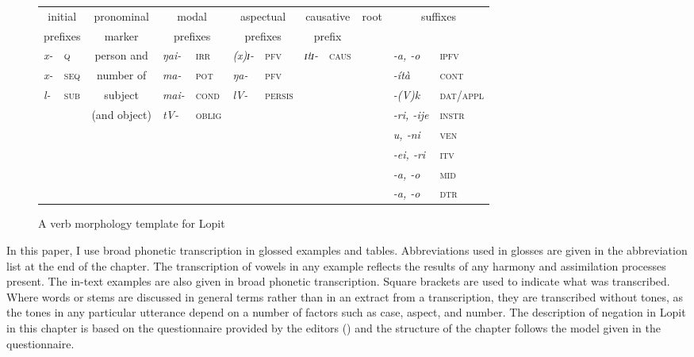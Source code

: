 \documentclass[output=paper,colorlinks,citecolor=brown,draftmode]{langscibook}
\begin{document}
\begin{figure} \footnotesize
\begin{tabular}{l@{  }l | c | l@{  }l | l@{ }l | l@{ }l | c@{} | l @{ }l}
\multicolumn{2}{c|}{initial} & \multicolumn{1}{c|}{pronominal} & \multicolumn{2}{c|}{modal} & \multicolumn{2}{c|}{aspectual} & \multicolumn{2}{c|}{causative} & \multicolumn{1}{c|}{root} & \multicolumn{2}{c}{suffixes}\\
\multicolumn{2}{c|}{prefixes} & \multicolumn{1}{c|}{marker} & \multicolumn{2}{c|}{prefixes} & \multicolumn{2}{c|}{prefixes} & \multicolumn{2}{c|}{prefix} & & \\
\hline
\textit{x-} & \textsc{q} & {person and} & \textit{ŋai-} &  \textsc{irr} & \textit{(x)ɪ-} & \textsc{pfv} & \textit{ɪtɪ-} & \textsc{caus} && \textit{-a, -o} & \textsc{ipfv} \\
\textit{x-} & \textsc{seq} & number of &  \textit{ma-} & \textsc{pot} & \textit{ŋa-} & \textsc{pfv} &  & & & \textit{-ítà} & \textsc{cont} \\
\textit{l-} & \textsc{sub} & subject & \textit{mai-} & \textsc{cond} & \textit{lV-} & \textsc{persis} & & &  & \textit{-(V)k} & \textsc{dat/appl} \\
& & (and object) & \textit{tV-} & \textsc{oblig} &  &  & &  &  & \textit{-ri, -ije} & \textsc{instr}\\
\multicolumn{2}{c}{} &  &  &  &  &  &  &  &  & \textit{u, -ni} & \textsc{ven}\\
\multicolumn{2}{c}{} &  &  &  &  &  &  &  &  & \textit{-ei, -ri} & \textsc{itv}\\
\multicolumn{2}{c}{} &  &  &  &  &  &  &  &  & \textit{-a, -o} & \textsc{mid} \\
\multicolumn{2}{c}{} &  &  &  &  &  &  &  &  & \textit{-a, -o} & \textsc{dtr}\\
\end{tabular}
\caption{A verb morphology template for Lopit}
\label{fig:lop:2}
\end{figure}

In this paper, I use broad phonetic transcription in glossed examples and tables. Abbreviations used in glosses are given in the abbreviation list at the end of the chapter. The transcription of vowels in any example reflects the results of any harmony and assimilation processes present. The in-text examples are also given in broad phonetic transcription. Square brackets are used to indicate what was transcribed. Where words or stems are discussed in general terms rather than in an extract from a transcription, they are transcribed without tones, as the tones in any particular utterance depend on a number of factors such as case, aspect, and number. The description of negation in Lopit in this chapter is based on the questionnaire provided by the editors () and the structure of the chapter follows the model given in the questionnaire.
\end{document}

